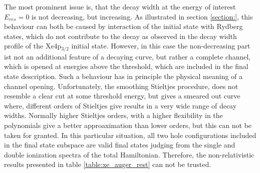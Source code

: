 The most prominent issue is, that the decay width at the energy of interest
$E_{res}=0$ is not decreasing, but increasing. As illustrated in section
\ref{section:}, this behaviour can both be caused by interaction of
the initial state with Rydberg states, which do not contribute to the decay
as observed in the decay width profile of the Xe4p$_{3/2}$ initial state.
However, in this case the non-decreasing part ist not an additional feature
of a decaying curve, but rather a complete channel, which is opened at energies
above the threshold, which are included in the final state description. Such
a behaviour has in principle the physical meaning of a channel opening.
Unfortunately, the smoothing Stieltjes procedure, does not resemble a clear
cut at some threshold energy, but gives a smeared out curve where, different
orders of Stieltjes give results in a very wide range of decay widths.
Normally higher Stieltjes orders, with a higher flexibility in the polynomials give
a better approaximation than lower orders, but this can not be taken for granted.
In this particular situation, all two hole configurations included in the
final state subspace are valid final states judging from the single and
double ionization spectra of the total Hamiltonian. Therefore, the
non-relativistic results presented in table \ref{table:xe_auger_rest} can
not be trusted.

